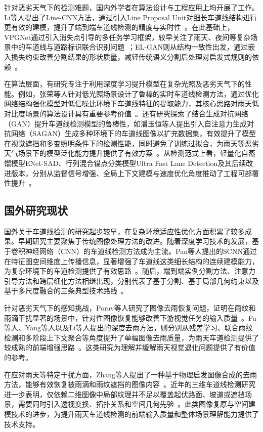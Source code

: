 针对恶劣天气下的检测难题，国内外学者在算法设计与工程应用上均开展了工作。Li等人提出了Line-CNN方法，通过引入Line Proposal Unit对细长车道线结构进行更有效的建模，提升了端到端车道线检测的精度与实时性~\cite{li2022}。在此基础上，VPGNet通过引入消失点引导的多任务学习框架，较早关注了雨天、夜间等复杂场景中的车道线与道路标识联合识别问题~\cite{lee2017vpgnet}；EL-GAN则从结构一致性出发，通过嵌入损失约束改善分割结果的形状质量，减轻传统语义分割后处理对启发式规则的依赖~\cite{ghafoorian2018elgan}。

在算法层面，有研究专注于利用深度学习提升模型在复杂光照及恶劣天气下的性能。例如，张荣等人针对低光照场景设计了鲁棒的实时车道线检测方法，通过优化网络结构强化模型对低信噪比环境下车道线特征的提取能力，其核心思路对雨天低对比度场景的算法设计具有重要参考价值~\cite{zhang2024}。还有研究探索了结合生成对抗网络（GAN）提升车道线检测模型的鲁棒性，如潘玉恒等人提出引入自注意力生成对抗网络（SAGAN）生成多种环境下的车道线图像以扩充数据集，有效提升了模型在视觉遮挡和多变照明条件下的检测性能，同时避免了训练过拟合，为雨天等恶劣天气场景下的模型泛化能力提升提供了有效方案~\cite{pan2024}。从检测范式上看，轻量化自蒸馏模型ENet-SAD、行列混合锚点分类模型Ultra Fast Lane Detection及其后续改进版本，分别从监督信号增强、全局上下文建模与速度优化角度推动了工程可部署性提升~\cite{hou2019sad,qin2020ultrafast,qin2024ultrafastv2}。

\subsection{国外研究现状}
国外关于车道线检测的研究起步较早，在复杂环境适应性优化方面积累了较多成果。早期研究主要聚焦于传统图像处理方法的改进。随着深度学习技术的发展，基于卷积神经网络（CNN）的车道线检测方法成为主流。Pan等人提出的SCNN通过在特征图空间维度上传播信息，显著增强了车道线这类细长结构的连续建模能力，为复杂环境下的车道检测提供了有效思路~\cite{pan2018spatial}。随后，端到端实例分割方法、注意力引导方法和跨层细化方法相继出现，分别代表了基于分割、基于局部几何约束以及基于多尺度融合的三条典型技术路线~\cite{neven2018,tabellion2021laneatt,zheng2022clrnet}。

针对恶劣天气下的感知挑战，Porav等人研究了图像去雨恢复问题，证明在雨纹和雨滴干扰显著的场景中，针对性图像恢复能够改善下游视觉任务的输入质量~\cite{porav2019}。Fu等人、Yang等人以及Li等人提出的深度去雨方法，则分别从残差学习、联合雨纹检测和多阶段上下文聚合等角度提升了单幅图像去雨质量，为雨天车道检测提供了较成熟的前端增强思路~\cite{fu2017ddn,yang2017jointderain,li2018rescan}。这类研究为理解并缓解雨天视觉退化问题提供了有价值的参考。

在应对雨天等特定干扰方面，Zhang等人提出了一种基于物理启发图像合成的去雨方法，能够有效恢复被雨滴和雨纹遮挡的图像内容~\cite{zhang2018}。近年的三维车道线检测研究进一步表明，仅依赖二维图像中局部纹理并不足以覆盖起伏路面、坡道或遮挡场景，需要同时引入透视变换、拓扑关系和空间几何先验~\cite{garnett2019threedlanenet,chen2022persformer}。此类图像复原与空间建模技术的进步，为提升雨天车道线检测的前端输入质量和整体场景理解能力提供了技术支持。

